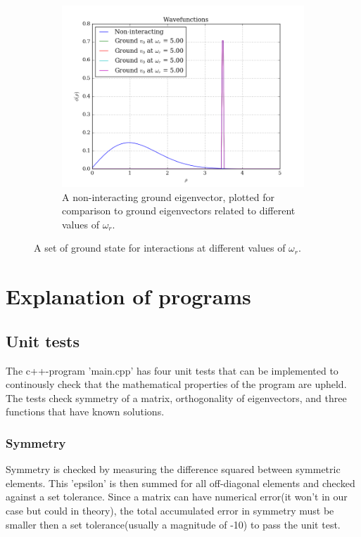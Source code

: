 \documentclass[11pt,a4paper,notitlepage]{article}
\begin{document}
\begin{figure}[H]
\begin{subfigure}[t]{0.45\textwidth}
 		\includegraphics[scale=0.40]{../eigvecs_vs_each_other.png}
 		\caption{A non-interacting ground eigenvector, plotted for comparison to ground eigenvectors related to different values of $\omega_r$.}\label{fig:ground-eigvecs-compare}
 	\end{subfigure}
 	\caption{A set of ground state for interactions at different values of $\omega_r$.}\label{fig:eigvecs-interact}
 \end{figure}

\section{Explanation of programs}
\subsection{Unit tests} \label{sec:unit tests}
The c++-program 'main.cpp' has four unit tests that can be implemented to continously check that the mathematical properties of the program are upheld.
The tests check symmetry of a matrix, orthogonality of eigenvectors, and three functions that have known solutions.
\subsubsection{Symmetry}
Symmetry is checked by measuring the difference squared between symmetric elements. This 'epsilon' is then summed for all off-diagonal elements and checked against a set tolerance.
Since a matrix can have numerical error(it won't in our case but could in theory), the total accumulated error in symmetry must be smaller then a set tolerance(usually a magnitude of -10) to pass the unit test.
\end{document}
